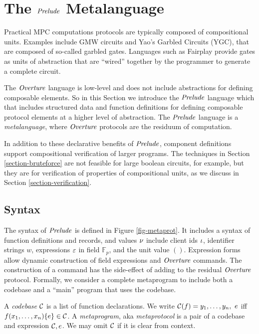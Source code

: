 \section{The $\mathit{Prelude}$ Metalanguage}
\label{section-metalang}

Practical MPC computations protocols are
typically composed of compositional units. Examples include GMW circuits
and Yao's Garbled Circuits (YGC), that are composed of so-called
garbled gates. Languages such as Fairplay \cite{269581} provide gates as
units of abstraction that are ``wired'' together by the programmer to
generate a complete circuit.

The $\mathit{Overture}$ language is low-level and does not include abstractions for
defining composable elements. So in this Section we introduce the $\mathit{Prelude}$
language which that includes structured data and function definitions
for defining composable protocol elements at a higher level of abstraction. 
The $\mathit{Prelude}$ language is a \emph{metalanguage}, where 
$\mathit{Overture}$ protocols are the residuum of computation.

In addition to these declarative benefits of $\mathit{Prelude}$, component
definitions support compositional verification of larger programs.
The techniques in Section \ref{section-bruteforce} are not feasible
for large boolean circuits, for example, but they are for verification
of properties of compositional units, as we discuss in Section
\ref{section-verification}.

\subsection{Syntax}

The syntax of $\mathit{Prelude}$ is defined in Figure
\ref{fig-metaprot}.  It includes a syntax of function
definitions and records, and values $\nu$ include client ids $\iota$, identifier
strings $w$, expressions $\varepsilon$ in field $\mathbb{F}_p$, and the unit value $()$.
Expression forms allow dynamic construction of field expressions and $\mathit{Overture}$ commands.
The construction of a command has the side-effect of adding to the residual
$\mathit{Overture}$ protocol. Formally, we consider a complete metaprogram to include both a
codebase and a ``main'' program that uses the codebase. 
\begin{definition}
A \emph{codebase} $\mathcal{C}$ is a list of function 
declarations. We write $ \mathcal{C}(f) = y_1,\ldots,y_n,\ e$
iff $f(x_1,\ldots,x_n) \{ e \} \in \mathcal{C}$.
A \emph{metaprogram}, aka \emph{metaprotocol}  is a pair of a 
codebase and expression $\mathcal{C}, e$. We may omit
$\mathcal{C}$ if it is clear from context.  
\end{definition}

